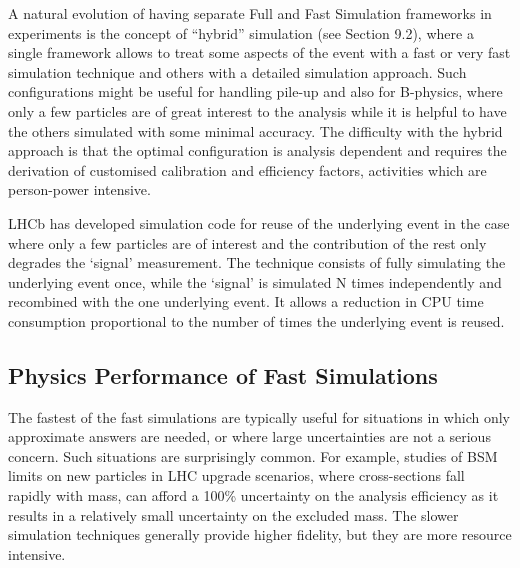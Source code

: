 \documentclass[12pt,a4paper]{article}
\begin{document}
{A natural evolution of having separate Full and Fast Simulation
frameworks in experiments is the concept of ``hybrid'' simulation (see
Section 9.2), where a single framework allows to treat some aspects of the
event with a fast or very fast simulation technique and others with a
detailed simulation approach. Such configurations might be useful for
handling pile-up and also for B-physics, where only a few particles are
of great interest to the analysis while it is helpful to have the others
simulated with some minimal accuracy. The difficulty with the hybrid
approach is that the optimal configuration is analysis dependent and
requires the derivation of customised calibration and efficiency
factors, activities which are person-power intensive.

LHCb has developed simulation code for reuse of the underlying event in
the case where only a few particles are of interest and the contribution
of the rest only degrades the `signal' measurement. The technique
consists of fully simulating the underlying event once, while the
`signal' is simulated N times independently and recombined with the one
underlying event. It allows a reduction in CPU time consumption
proportional to the number of times the underlying event is reused.

\hypertarget{physics-performance-of-fast-simulations}{%
\subsection{Physics Performance of Fast
Simulations}\label{physics-performance-of-fast-simulations}}

The fastest of the fast simulations are typically useful for situations
in which only approximate answers are needed, or where large
uncertainties are not a serious concern. Such situations are
surprisingly common. For example, studies of BSM limits on new particles
in LHC upgrade scenarios, where cross-sections fall rapidly with mass,
can afford a 100\% uncertainty on the analysis efficiency as it results
in a relatively small uncertainty on the excluded mass. The slower
simulation techniques generally provide higher fidelity, but they are
more resource intensive.

}
\end{document}
